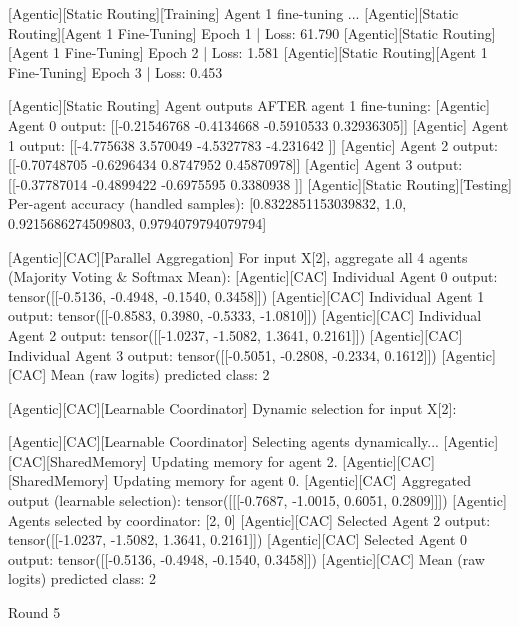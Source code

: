 [Agentic][Static Routing][Training] Agent 1 fine-tuning ...
[Agentic][Static Routing][Agent 1 Fine-Tuning] Epoch 1 | Loss: 61.790
[Agentic][Static Routing][Agent 1 Fine-Tuning] Epoch 2 | Loss: 1.581
[Agentic][Static Routing][Agent 1 Fine-Tuning] Epoch 3 | Loss: 0.453

[Agentic][Static Routing] Agent outputs AFTER agent 1 fine-tuning:
[Agentic] Agent 0 output: [[-0.21546768 -0.4134668  -0.5910533   0.32936305]]
[Agentic] Agent 1 output: [[-4.775638   3.570049  -4.5327783 -4.231642 ]]
[Agentic] Agent 2 output: [[-0.70748705 -0.6296434   0.8747952   0.45870978]]
[Agentic] Agent 3 output: [[-0.37787014 -0.4899422  -0.6975595   0.3380938 ]]
[Agentic][Static Routing][Testing] Per-agent accuracy (handled samples): [0.8322851153039832, 1.0, 0.9215686274509803, 0.9794079794079794]

[Agentic][CAC][Parallel Aggregation] For input X[2], aggregate all 4 agents (Majority Voting & Softmax Mean):
[Agentic][CAC] Individual Agent 0 output: tensor([[-0.5136, -0.4948, -0.1540,  0.3458]])
[Agentic][CAC] Individual Agent 1 output: tensor([[-0.8583,  0.3980, -0.5333, -1.0810]])
[Agentic][CAC] Individual Agent 2 output: tensor([[-1.0237, -1.5082,  1.3641,  0.2161]])
[Agentic][CAC] Individual Agent 3 output: tensor([[-0.5051, -0.2808, -0.2334,  0.1612]])
[Agentic][CAC] Mean (raw logits) predicted class: 2

[Agentic][CAC][Learnable Coordinator] Dynamic selection for input X[2]:

[Agentic][CAC][Learnable Coordinator] Selecting agents dynamically...
[Agentic][CAC][SharedMemory] Updating memory for agent 2.
[Agentic][CAC][SharedMemory] Updating memory for agent 0.
[Agentic][CAC] Aggregated output (learnable selection): tensor([[[-0.7687, -1.0015,  0.6051,  0.2809]]])
[Agentic] Agents selected by coordinator: [2, 0]
[Agentic][CAC] Selected Agent 2 output: tensor([[-1.0237, -1.5082,  1.3641,  0.2161]])
[Agentic][CAC] Selected Agent 0 output: tensor([[-0.5136, -0.4948, -0.1540,  0.3458]])
[Agentic][CAC] Mean (raw logits) predicted class: 2
	
Round 5

